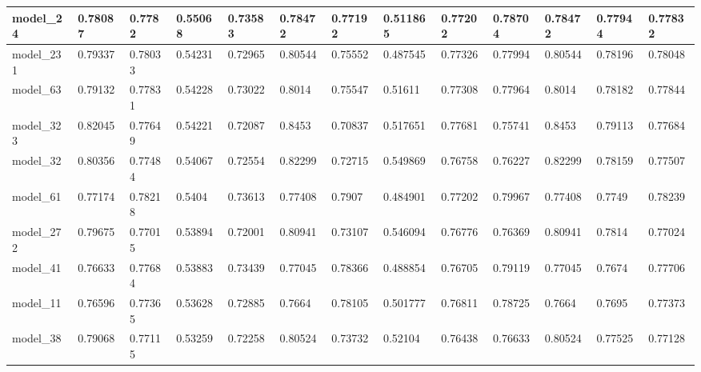 \begin{tabular}{|l|l|l|l|l|l|l|l|l|l|l|l|l|}
model\_24      & 0.78087     & 0.7782         & 0.55068      & 0.73583          & 0.78472              & 0.77192              & 0.511865     & 0.77202           & 0.78704            & 0.78472         & 0.77944     & 0.77832      \\ \hline
model\_231     & 0.79337     & 0.78033        & 0.54231      & 0.72965          & 0.80544              & 0.75552              & 0.487545     & 0.77326           & 0.77994            & 0.80544         & 0.78196     & 0.78048      \\ \hline
model\_63      & 0.79132     & 0.77831        & 0.54228      & 0.73022          & 0.8014               & 0.75547              & 0.51611      & 0.77308           & 0.77964            & 0.8014          & 0.78182     & 0.77844      \\ \hline
model\_323     & 0.82045     & 0.77649        & 0.54221      & 0.72087          & 0.8453               & 0.70837              & 0.517651     & 0.77681           & 0.75741            & 0.8453          & 0.79113     & 0.77684      \\ \hline
model\_32      & 0.80356     & 0.77484        & 0.54067      & 0.72554          & 0.82299              & 0.72715              & 0.549869     & 0.76758           & 0.76227            & 0.82299         & 0.78159     & 0.77507      \\ \hline
model\_61      & 0.77174     & 0.78218        & 0.5404       & 0.73613          & 0.77408              & 0.7907               & 0.484901     & 0.77202           & 0.79967            & 0.77408         & 0.7749      & 0.78239      \\ \hline
model\_272     & 0.79675     & 0.77015        & 0.53894      & 0.72001          & 0.80941              & 0.73107              & 0.546094     & 0.76776           & 0.76369            & 0.80941         & 0.7814      & 0.77024      \\ \hline
model\_41      & 0.76633     & 0.77684        & 0.53883      & 0.73439          & 0.77045              & 0.78366              & 0.488854     & 0.76705           & 0.79119            & 0.77045         & 0.7674      & 0.77706      \\ \hline
model\_11      & 0.76596     & 0.77365        & 0.53628      & 0.72885          & 0.7664               & 0.78105              & 0.501777     & 0.76811           & 0.78725            & 0.7664          & 0.7695      & 0.77373      \\ \hline
model\_38      & 0.79068     & 0.77115        & 0.53259      & 0.72258          & 0.80524              & 0.73732              & 0.52104      & 0.76438           & 0.76633            & 0.80524         & 0.77525     & 0.77128      \\ \hline

\end{tabular}
